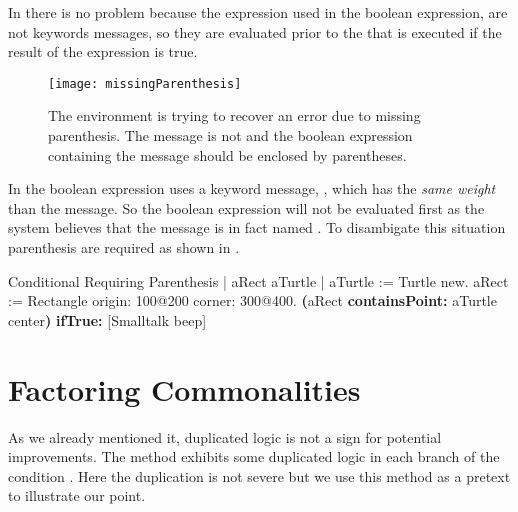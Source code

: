 In  there is no problem because the expression used in the 
boolean expression,  are not keywords messages, so they are evaluated prior to the  that is executed if the result of the expression is true.


\begin{figure}
\begin{center}
\texttt{[image: missingParenthesis]}
\caption{The environment is  trying to recover an error due to missing parenthesis. The message is not  and the boolean expression containing the message  should be enclosed by parentheses.\label{fig:missingParenthesis}}
\end{center}
\end{figure}

In   the boolean expression uses a keyword message, , which has the \textit{same weight} than the  message. So the boolean expression will not be evaluated first as the system believes that the message is in fact named . To disambigate this situation parenthesis are required as shown in . 

\begin{scriptwithtitle}{Conditional Requiring Parenthesis}\label{scr:withParenthesis}
| aRect aTurtle |
aTurtle := Turtle new.
aRect := Rectangle origin: 100@200 corner: 300@400.
\textbf{(}aRect \textbf{containsPoint:} aTurtle center\textbf{)}
    \textbf{ifTrue:} [Smalltalk beep]
\end{scriptwithtitle}



	
\section{Factoring Commonalities}

As we already mentioned it, duplicated logic is not a sign for potential improvements.  The method  exhibits some duplicated logic in each branch of the condition . Here the duplication is not severe but we use this method as a pretext to illustrate our point. 

